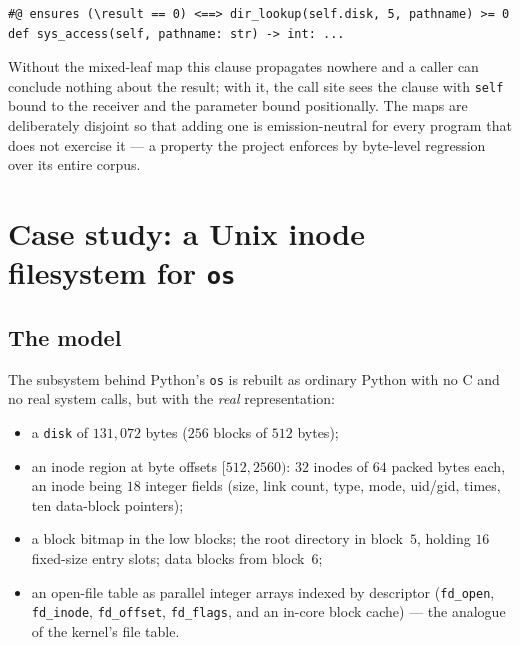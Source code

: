 \documentclass[11pt]{article}
\newcommand{\osmod}{\texttt{os}}
\begin{document}
\begin{lstlisting}
#@ ensures (\result == 0) <==> dir_lookup(self.disk, 5, pathname) >= 0
def sys_access(self, pathname: str) -> int: ...
\end{lstlisting}

\noindent
Without the mixed-leaf map this clause propagates nowhere and a caller can
conclude nothing about the result; with it, the call site sees the clause
with \texttt{self} bound to the receiver and the parameter bound
positionally. The maps are deliberately disjoint so that adding one is
emission-neutral for every program that does not exercise it --- a property
the project enforces by byte-level regression over its entire corpus.

\section{Case study: a Unix inode filesystem for \osmod{}}\label{sec:casestudy}

\subsection{The model}

The subsystem behind Python's \osmod{} is rebuilt as ordinary Python with no
C and no real system calls, but with the \emph{real} representation:

\begin{itemize}
\item a \texttt{disk} of $131{,}072$ bytes ($256$ blocks of $512$ bytes);
\item an inode region at byte offsets $[512, 2560)$: $32$ inodes of $64$
  packed bytes each, an inode being $18$ integer fields (size, link count,
  type, mode, uid/gid, times, ten data-block pointers);
\item a block bitmap in the low blocks; the root directory in block~$5$,
  holding $16$ fixed-size entry slots; data blocks from block~$6$;
\item an open-file table as parallel integer arrays indexed by descriptor
  (\texttt{fd\_open}, \texttt{fd\_inode}, \texttt{fd\_offset},
  \texttt{fd\_flags}, and an in-core block cache) --- the analogue of the
  kernel's file table.
\end{itemize}
\end{document}
